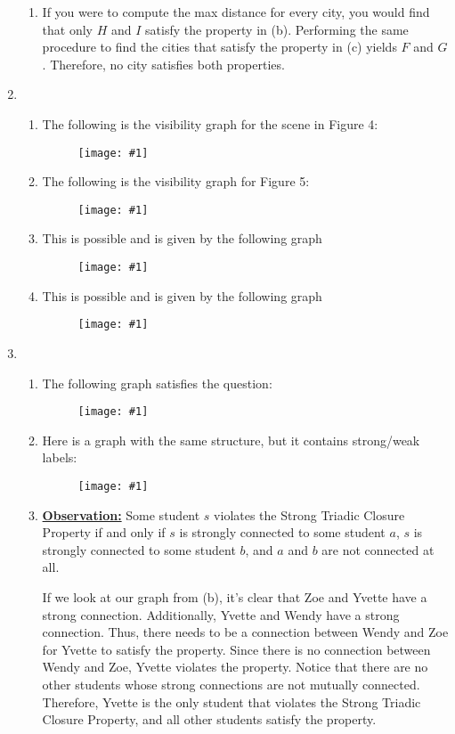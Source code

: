 \documentclass{article}
\newcommand{\image}[1]{\begin{figure}[H]
            \texttt{[image: \#1]}
            \centering
        \end{figure}}
\begin{document}
\begin{enumerate}
\begin{enumerate}
        \item If you were to compute the max distance for every city, you would find that only $H$ and $I$ satisfy the property in (b). Performing the same procedure to find the cities that satisfy the property in (c) yields $F$ and $G$. Therefore, no city satisfies both properties.
    \end{enumerate}

    \item 
    \begin{enumerate}
        \item The following is the visibility graph for the scene in Figure 4:

        \image{hw1q2a}

        \item The following is the visibility graph for Figure 5:

        \image{hw1q2b}

        \item This is possible and is given by the following graph

        \image{hw1q2c}

        \item This is possible and is given by the following graph

        \image{hw1q2d}
        

        
    \end{enumerate}

    \item
    \begin{enumerate}
        \item The following graph satisfies the question:

        \image{hw1q3a.png}

        \item Here is a graph with the same structure, but it contains strong/weak labels:

        \image{hw1q3b.png}

        \item 
        \textbf{\underline{Observation:}} Some student $s$ violates the Strong Triadic Closure Property if and only if $s$ is strongly connected to some student $a$, $s$ is strongly connected to some student $b$, and $a$ and $b$ are not connected at all.
        
        If we look at our graph from (b), it's clear that Zoe and Yvette have a strong connection. Additionally, Yvette and Wendy have a strong connection. Thus, there needs to be a connection between Wendy and Zoe for Yvette to satisfy the property. Since there is no connection between Wendy and Zoe, Yvette violates the property. Notice that there are no other students whose strong connections are not mutually connected. Therefore, Yvette is the only student that violates the Strong Triadic Closure Property, and all other students satisfy the property.
    \end{enumerate}


\end{enumerate}
\end{document}
